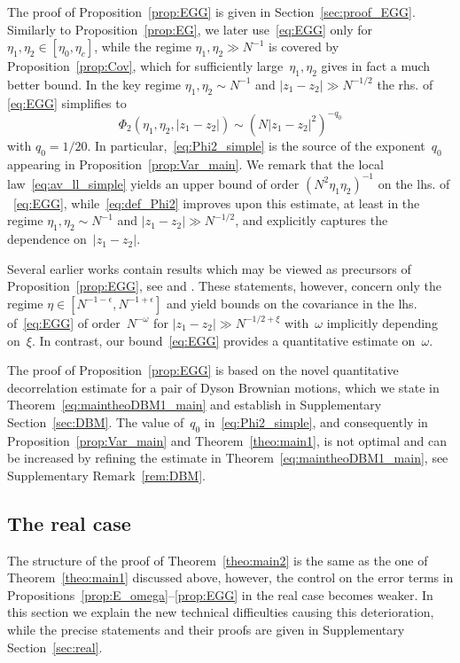 \documentclass[10pt]{amsart}
\numberwithin{equation}{section}
\begin{document}
The proof of Proposition~\ref{prop:EGG} is given in Section~\ref{sec:proof_EGG}. Similarly to Proposition~\ref{prop:EG}, we later use~\eqref{eq:EGG} only for $\eta_1,\eta_2\in [\eta_0,\eta_c]$, while the regime $\eta_1,\eta_2\gg N^{-1}$ is covered by Proposition~\ref{prop:Cov}, which for sufficiently large~$\eta_1,\eta_2$ gives in fact a much better bound. In the key regime $\eta_1,\eta_2\sim N^{-1}$ and $|z_1-z_2|\gg N^{-1/2}$ the rhs. of \eqref{eq:EGG} simplifies to
\begin{equation}
\Phi_2(\eta_1,\eta_2,|z_1-z_2|)\sim \left(N|z_1-z_2|^2\right)^{-q_0}
\label{eq:Phi2_simple}
\end{equation}
with $q_0=1/20$. In particular,~\eqref{eq:Phi2_simple} is the source of the exponent~$q_0$ appearing in Proposition~\ref{prop:Var_main}. We remark that the local law~\eqref{eq:av_ll_simple} yields an upper bound of order $(N^2\eta_1\eta_2)^{-1}$ on the lhs. of ~\eqref{eq:EGG}, while~\eqref{eq:def_Phi2} improves upon this estimate, at least in the regime $\eta_1,\eta_2\sim N^{-1}$ and $|z_1-z_2|\gg N^{-1/2}$, and explicitly captures the dependence on~$|z_1-z_2|$.

Several earlier works contain results which may be viewed as precursors of Proposition~\ref{prop:EGG}, see \cite[Proposition 3.5]{macroCLT_complex} and \cite[Proposition 3.5]{Cipolloni_meso}. These statements, however, concern only the regime $\eta\in [N^{-1-\epsilon},N^{-1+\epsilon}]$ and yield bounds on the covariance in the lhs. of~\eqref{eq:EGG} of order~$N^{-\omega}$ for $|z_1-z_2|\gg N^{-1/2+\xi}$ with~$\omega$ implicitly depending on~$\xi$. In contrast, our bound~\eqref{eq:EGG} provides a quantitative estimate on~$\omega$.

The proof of Proposition~\ref{prop:EGG} is based on the novel quantitative decorrelation estimate for a pair of Dyson Brownian motions, which we state in Theorem~\ref{eq:maintheoDBM1_main} and establish in Supplementary Section~\ref{sec:DBM}. The value of~$q_0$ in~\eqref{eq:Phi2_simple}, and consequently in Proposition~\ref{prop:Var_main} and Theorem~\ref{theo:main1}, is not optimal and can be increased by refining the estimate in Theorem~\ref{eq:maintheoDBM1_main}, see Supplementary Remark~\ref{rem:DBM}.




\subsection{The real case}\label{sec:real_ideas} The structure of the proof of Theorem~\ref{theo:main2} is the same as the one of Theorem~\ref{theo:main1} discussed above, however, the control on the error terms in Propositions~\ref{prop:E_omega}--\ref{prop:EGG} in the real case becomes weaker. In this section we explain the new technical difficulties causing this deterioration, while the precise statements and their proofs are given in Supplementary Section~\ref{sec:real}. 
\end{document}
